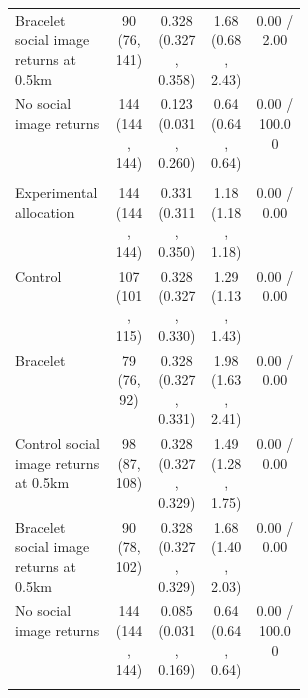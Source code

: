 \begin{longtable}{p{0.34\linewidth}cccc}
Bracelet social image returns at 0.5km & \makecell[c]{90\\(76, 141)} & \makecell[c]{0.328\\(0.327, 0.358)} & \makecell[c]{1.68\\(0.68, 2.43)} & 0.00 / 2.00 \\
No social image returns & \makecell[c]{144\\(144, 144)} & \makecell[c]{0.123\\(0.031, 0.260)} & \makecell[c]{0.64\\(0.64, 0.64)} & 0.00 / 100.00 \\
\addlinespace
\multicolumn{5}{l}{\textit{Student-t(5) intrinsic-motivation types}} \\
Experimental allocation & \makecell[c]{144\\(144, 144)} & \makecell[c]{0.331\\(0.311, 0.350)} & \makecell[c]{1.18\\(1.18, 1.18)} & 0.00 / 0.00 \\
Control & \makecell[c]{107\\(101, 115)} & \makecell[c]{0.328\\(0.327, 0.330)} & \makecell[c]{1.29\\(1.13, 1.43)} & 0.00 / 0.00 \\
Bracelet & \makecell[c]{79\\(76, 92)} & \makecell[c]{0.328\\(0.327, 0.331)} & \makecell[c]{1.98\\(1.63, 2.41)} & 0.00 / 0.00 \\
Control social image returns at 0.5km & \makecell[c]{98\\(87, 108)} & \makecell[c]{0.328\\(0.327, 0.329)} & \makecell[c]{1.49\\(1.28, 1.75)} & 0.00 / 0.00 \\
Bracelet social image returns at 0.5km & \makecell[c]{90\\(78, 102)} & \makecell[c]{0.328\\(0.327, 0.329)} & \makecell[c]{1.68\\(1.40, 2.03)} & 0.00 / 0.00 \\
No social image returns & \makecell[c]{144\\(144, 144)} & \makecell[c]{0.085\\(0.031, 0.169)} & \makecell[c]{0.64\\(0.64, 0.64)} & 0.00 / 100.00 \\
\addlinespace
\multicolumn{5}{l}{\textit{Cluster random shock}} \\

\end{longtable}
